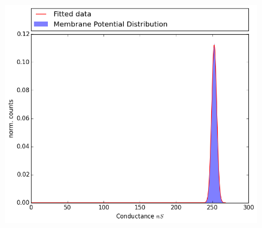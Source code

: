 \documentclass[12pt]{article}
\newenvironment{exercise}[2][Exercise]{\begin{trivlist}
\item[\hskip \labelsep {\bfseries #1}\hskip \labelsep {\bfseries #2.}]}{\end{trivlist}}
\begin{document}
\begin{exercise}{4.1}
\begin{enumerate}
{  \includegraphics[width=4.4in]{codes/excercise1_cond}}

\end{enumerate}

\end{exercise}
\end{document}
